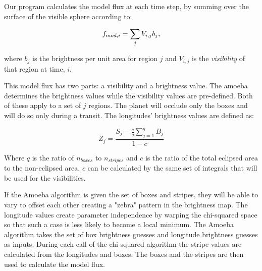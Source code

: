 Our program calculates the model flux at each time step, by summing over the surface of the visible sphere according to:

\begin{equation}
	\mbox{$f_{mod,i}$} = \sum_j V_{i,j}b_j, 
\end{equation}

where $b_j$ is the brightness per unit area for region $j$ and $V_{i,j}$ is the {\it visibility} of that region at time, $i$.


This model flux has two parts: a visibility and a brightness value. The amoeba determines the brightness values while the visibility values are pre-defined. Both of these apply to a set of $j$ regions. 
The planet will occlude only the boxes and will do so only during a transit. The longitudes' brightness values are defined as:

\begin{equation}
Z_j = \frac{S_j - \frac{c}{q} \sum_{j=1}^{q}B_j}{1- c}
\end{equation}

Where $q$ is the ratio of $n_{boxes}$ to $n_{stripes}$ and $c$ is the ratio of the total eclipsed area to the non-eclipsed area. $c$ can be calculated by the same set of integrals that will be used for the visibilities.

If the Amoeba algorithm is given the set of boxes and stripes, they will be able to vary to offset each other creating a "zebra" pattern in the brightness map.  The longitude values create parameter independence by warping the chi-squared space so that such a case is less likely to become a local minimum. The Amoeba algorithm takes the set of box brightness guesses and longitude brightness guesses as inputs. During each call of the chi-squared algorithm the stripe values are calculated from the longitudes and boxes. The boxes and the stripes are then used to calculate the model flux.

